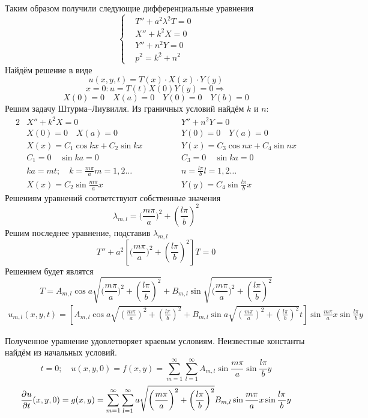 	Таким образом получили следующие дифференциальные уравнения
	\[
		\left\{
		\begin{aligned}
			&T'' + a^2 \lambda^2 T = 0 \\
			&X'' + k^2X = 0\\	
			&Y'' + n^2 Y = 0\\
			&p^2 = k^2 + n^2\
		\end{aligned}
		\right.
	\]
	Найдём решение в виде
	\[
		u(x,y,t) = T(x) \cdot X(x)\cdot Y(y)
	\]
	\[
		x=0: u = T(t) X(0) Y(y) = 0 \Rightarrow
	\]
	\[
		X(0) = 0 \quad X(a) = 0 \quad Y(0) = 0 \quad Y(b)= 0
	\]
	Решим задачу Штурма--Лиувилля. Из граничных условий найдём $k$ и $n$:
	\begin{alignat*}{2}
		&X'' + k^2 X = 0	&\phantom{\qquad}\quad&Y'' + n^2 Y = 0\\
		&X(0) = 0 \quad X(a) = 0	&&Y(0) = 0 \quad Y(a) = 0\\
		&X(x)= C_1 \cos k x + C_2 \sin k x	&&Y(x)= C_3 \cos n x + C_4 \sin n x\\
		&C_1 = 0 \quad \sin ka= 0	&&C_3 = 0 \quad \sin ka= 0\\
		&ka = mt; \quad k = \frac{m\pi}{a} m=1,2\dots		&&n = \frac{l \pi}{b} l =1,2 \dots\\
		&X(x)= C_2 \sin  \frac{m \pi}{a} x	&&Y(y) = C_4 \sin \frac{l \pi}{b} x		
	\end{alignat*}
	Решениям уравнений соответствуют собственные значения
	\[	
		\lambda_{m, l} = \bigg(\frac{m \pi}{a}\bigg)^2 +\left(\frac{l \pi}{b}\right)^2 
	\]
	Решим последнее уравнение, подставив $\lambda_{m, l}$
	\[
		T'' + a^2 \left[\bigg(\frac{m \pi}{a}\bigg)^2 +\left(\frac{l \pi}{b}\right)^2\right]T = 0
	\]
	Решением будет являтся
	\[	
		T = A_{m, l} \cos a \sqrt{\bigg(\frac{m \pi}{a}\bigg)^2 +\left(\frac{l \pi}{b}\right)^2 } + B_{m, l} \sin \sqrt{\bigg(\frac{m \pi}{a}\bigg)^2 +\left(\frac{l \pi}{b}\right)^2 }
	\]
	\begin{multline*}
		u_{m,l} (x,y,t) = \left[A_{m,l} \cos a \sqrt{\left(\frac{m \pi}{a}\right)^2 + \left(\frac{l \pi}{b}\right)^2} + B_{m,l} \sin a \sqrt{\left(\frac{m \pi}{a}\right)^2 + \left(\frac{l \pi}{b}\right)^2} t\right] \sin \frac{m \pi}{a} x  \sin \frac{l \pi}{b} y
	\end{multline*}



	Полученное уравнение удовлетворяет краевым условиям.
	Неизвестные константы найдём из начальных условий.
	\begin{equation}
		t = 0; \quad u(x, y, 0) = f(x,y) = \sum\limits_{m=1}^{\infty} \sum\limits_{l = 1}^{\infty} A_{m,l} \sin \frac{m \pi}{a} \sin \frac{l \pi}{b} y
		\label{equ:equSquareMembr1}
	\end{equation}
	\begin{equation}
		\frac{\partial^{}u}{\partial t^{}}(x, y, 0) = g(x,y) = \sum\limits_{m=1}^{\infty} \sum\limits_{l = 1}^{\infty}  a \sqrt{\bigg(\frac{m \pi}{a}\bigg)^2  + \left(\frac{l \pi}{b}\right)^2} B_{m,l} \sin \frac{m \pi}{a} x \sin \frac{l \pi}{b} y
		\label{equ:equSquareMembr2}
	\end{equation}

